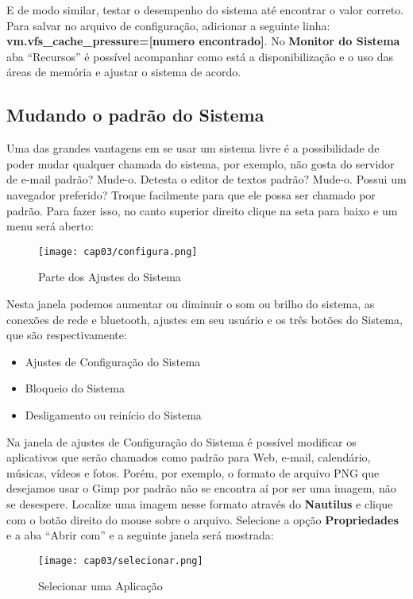 E de modo similar, testar o desempenho do sistema até encontrar o valor correto. Para salvar no arquivo de configuração, adicionar a seguinte linha: \textbf{vm.vfs\_cache\_pressure=[numero encontrado]}. No  \textbf{Monitor do Sistema} aba ``Recursos'' é possível acompanhar como está a disponibilização e o uso das áreas de memória e ajustar o sistema de acordo.

\subsection{Mudando o padrão do Sistema}
Uma das grandes vantagens em se usar um sistema livre é a possibilidade de poder mudar qualquer chamada do sistema, por exemplo, não gosta do servidor de e-mail padrão? Mude-o. Detesta o editor de textos padrão? Mude-o. Possui um navegador preferido? Troque facilmente para que ele possa ser chamado por padrão. Para fazer isso, no canto superior direito clique na seta para baixo e um menu será aberto:
\begin{figure}[H]
\centering\texttt{[image: cap03/configura.png]}
\caption{Parte dos Ajustes do Sistema}
\end{figure}

Nesta janela podemos aumentar ou diminuir o som ou brilho do sistema, as conexões de rede e bluetooth, ajustes em seu usuário e os três botões do Sistema, que são respectivamente: \vspace{-1em}
\begin{itemize}[noitemsep]
 \item Ajustes de Configuração do Sistema
 \item Bloqueio do Sistema
 \item Desligamento ou reinício do Sistema
\end{itemize}

Na janela de ajustes de Configuração do Sistema é possível modificar os aplicativos que serão chamados como padrão para Web, e-mail, calendário, músicas, vídeos e fotos. Porém, por exemplo, o formato de arquivo PNG que desejamos usar o Gimp por padrão não se encontra aí por ser uma imagem, não se desespere. Localize uma imagem nesse formato através do \textbf{Nautilus} e clique com o botão direito do mouse sobre o arquivo. Selecione a opção \textbf{Propriedades} e a aba ``Abrir com'' e a seguinte janela será mostrada:
\begin{figure}[H]
\centering\texttt{[image: cap03/selecionar.png]}
\caption{Selecionar uma Aplicação}
\end{figure}


